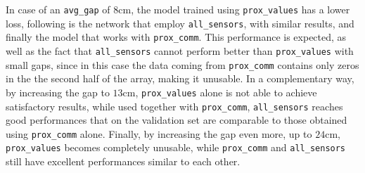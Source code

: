 In case of an \texttt{avg\_gap} of $8$cm, the model trained using 
\texttt{prox\_values} has a lower loss, following is the network that employ 
\texttt{all\_sensors}, with similar results, and finally the model that works with 
\texttt{prox\_comm}.
This performance is expected, as well as the fact that \texttt{all\_sensors} cannot 
perform better than \texttt{prox\_values} with small gaps, since in this case the 
data coming from \texttt{prox\_comm} contains only zeros in the the second half 
of the array, making it unusable.
In a complementary way, by increasing the gap to $13$cm,  
\texttt{prox\_values} alone is not able to achieve satisfactory results, while used 
together with \texttt{prox\_comm}, \texttt{all\_sensors} reaches good 
performances that on the validation set are comparable to those obtained using 
\texttt{prox\_comm} alone.
Finally, by increasing the gap even more, up to $24$cm, 
\texttt{prox\_values} becomes completely unusable, while \texttt{prox\_comm} 
and \texttt{all\_sensors} still have excellent performances similar to each other.


